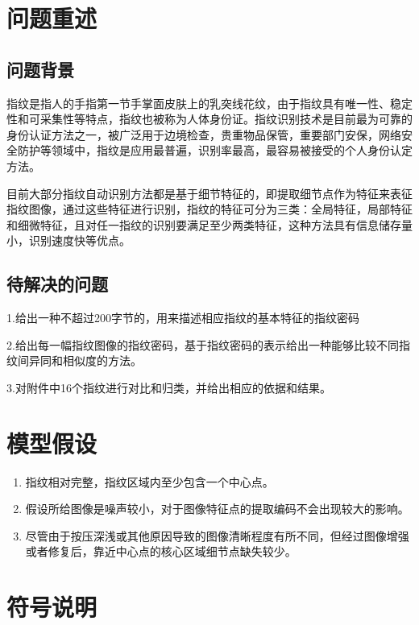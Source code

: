 \documentclass[withoutpreface,bwprint]{cumcmthesis} %
\begin{document}
\tableofcontents
\newpage

\section{问题重述}
\subsection{问题背景}
指纹是指人的手指第一节手掌面皮肤上的乳突线花纹，由于指纹具有唯一性、稳定性和可采集性等特点，指纹也被称为人体身份证。指纹识别技术是目前最为可靠的身份认证方法之一，被广泛用于边境检查，贵重物品保管，重要部门安保，网络安全防护等领域中，指纹是应用最普遍，识别率最高，最容易被接受的个人身份认定方法。

目前大部分指纹自动识别方法都是基于细节特征的，即提取细节点作为特征来表征指纹图像，通过这些特征进行识别，指纹的特征可分为三类：全局特征，局部特征和细微特征，且对任一指纹的识别要满足至少两类特征，这种方法具有信息储存量小，识别速度快等优点。

\subsection{待解决的问题}
1.给出一种不超过200字节的，用来描述相应指纹的基本特征的指纹密码

2.给出每一幅指纹图像的指纹密码，基于指纹密码的表示给出一种能够比较不同指纹间异同和相似度的方法。

3.对附件中16个指纹进行对比和归类，并给出相应的依据和结果。

\section{模型假设}
\begin{enumerate}
	\item 指纹相对完整，指纹区域内至少包含一个中心点。
	\item 假设所给图像是噪声较小，对于图像特征点的提取编码不会出现较大的影响。
	\item 尽管由于按压深浅或其他原因导致的图像清晰程度有所不同，但经过图像增强或者修复后，靠近中心点的核心区域细节点缺失较少。
\end{enumerate}

\newpage
\section{符号说明}
\end{document}

